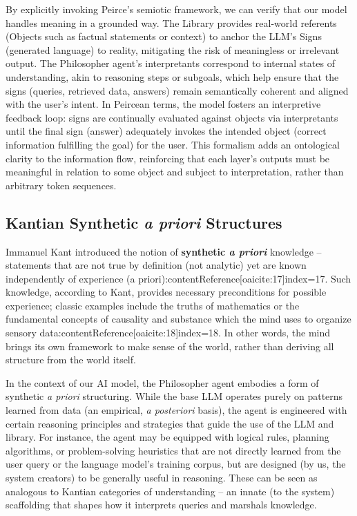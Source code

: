 \documentclass{article}
\begin{document}
By explicitly invoking Peirce's semiotic framework, we can verify that our model handles meaning in a grounded way. The Library provides real-world referents (Objects such as factual statements or context) to anchor the LLM's Signs (generated language) to reality, mitigating the risk of meaningless or irrelevant output. The Philosopher agent's interpretants correspond to internal states of understanding, akin to reasoning steps or subgoals, which help ensure that the signs (queries, retrieved data, answers) remain semantically coherent and aligned with the user's intent. In Peircean terms, the model fosters an interpretive feedback loop: signs are continually evaluated against objects via interpretants until the final sign (answer) adequately invokes the intended object (correct information fulfilling the goal) for the user. This formalism adds an ontological clarity to the information flow, reinforcing that each layer's outputs must be meaningful in relation to some object and subject to interpretation, rather than arbitrary token sequences.

\subsection{Kantian Synthetic \textit{a priori} Structures}
Immanuel Kant introduced the notion of \textbf{synthetic \emph{a priori}} knowledge – statements that are not true by definition (not analytic) yet are known independently of experience (a priori):contentReference[oaicite:17]{index=17}. Such knowledge, according to Kant, provides necessary preconditions for possible experience; classic examples include the truths of mathematics or the fundamental concepts of causality and substance which the mind uses to organize sensory data:contentReference[oaicite:18]{index=18}. In other words, the mind brings its own framework to make sense of the world, rather than deriving all structure from the world itself.

In the context of our AI model, the Philosopher agent embodies a form of synthetic \emph{a priori} structuring. While the base LLM operates purely on patterns learned from data (an empirical, \emph{a posteriori} basis), the agent is engineered with certain reasoning principles and strategies that guide the use of the LLM and library. For instance, the agent may be equipped with logical rules, planning algorithms, or problem-solving heuristics that are not directly learned from the user query or the language model's training corpus, but are designed (by us, the system creators) to be generally useful in reasoning. These can be seen as analogous to Kantian categories of understanding – an innate (to the system) scaffolding that shapes how it interprets queries and marshals knowledge.
\end{document}
